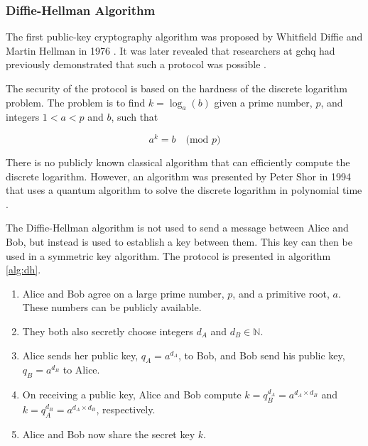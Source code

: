 


\subsubsection*{Diffie-Hellman Algorithm}

The first public-key cryptography algorithm was proposed by Whitfield Diffie and Martin Hellman in 1976 \cite{diffie1976new}. It was later revealed that researchers at \ac{gchq} had previously demonstrated that such a protocol was possible \cite{Ellis1970, williamson1974}.

The security of the protocol is based on the hardness of the discrete logarithm problem. The problem is to find $k = \log_a(b)$ given a prime number, $p$, and integers $1<a<p$ and $b$, such that

\begin{equation}
	a^k = b\quad\text{(mod } p\text{)}
\end{equation}

There is no publicly known classical algorithm that can efficiently compute the discrete logarithm. However, an algorithm was presented by Peter Shor in 1994 that uses a quantum algorithm to solve the discrete logarithm in polynomial time \cite{shor1994}.

The Diffie-Hellman algorithm is not used to send a message between Alice and Bob, but instead is used to establish a key between them. This key can then be used in a symmetric key algorithm. The protocol is presented in algorithm \ref{alg:dh}.

\begin{algorithm}
\label{alg:dh}
\begin{enumerate}
	\item Alice and Bob agree on a large prime number, $p$, and a primitive root, $a$. These numbers can be publicly available.
	\item They both also secretly choose integers $d_A$ and $d_B \in \mathbb{N}$.
	\item Alice sends her public key, $q_A = a^{d_A}$, to Bob, and Bob send his public key, $q_B = a^{d_B}$ to Alice.
	\item On receiving a public key, Alice and Bob compute $k = q_B^{d_A} = a^{d_A\times d_B}$ and $k = q_A^{d_B} = a^{d_A\times d_B}$, respectively.
	\item Alice and Bob now share the secret key $k$.
\end{enumerate}
\end{algorithm}

